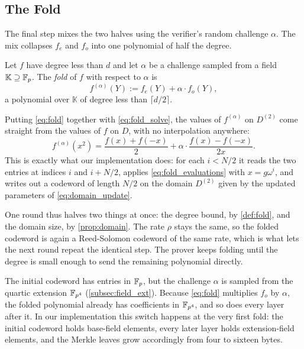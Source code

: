 \subsection{The Fold}
\label{subsec:the_fold}

The final step mixes the two halves using the verifier's random
challenge $\alpha$. The mix collapses $f_e$ and $f_o$ into one polynomial
of half the degree.

\begin{definition}
\label{def:fold}
Let $f$ have degree less than $d$ and let $\alpha$ be a challenge sampled
from a field $\mathbb{K} \supseteq \mathbb{F}_p$. The \emph{fold} of $f$ with
respect to $\alpha$ is
%
\begin{equation}
\label{eq:fold}
f^{(\alpha)}(Y) := f_{e}(Y) + \alpha \cdot f_{o}(Y) ,
\end{equation}
%
a polynomial over $\mathbb{K}$ of degree less than $\lceil d/2 \rceil$.
\end{definition}

Putting \cref{eq:fold} together with \cref{eq:fold_solve}, the values of
$f^{(\alpha)}$ on $D^{(2)}$ come straight from the values of $f$ on $D$,
with no interpolation anywhere:
%
\begin{equation}
\label{eq:fold_evaluations}
f^{(\alpha)}(x^2)
  = \frac{f(x) + f(-x)}{2}
  + \alpha \cdot \frac{f(x) - f(-x)}{2x} .
\end{equation}
%
This is exactly what our implementation does: for each $i < N/2$ it reads
the two entries at indices $i$ and $i + N/2$, applies
\cref{eq:fold_evaluations} with $x = g\omega^{i}$, and writes out a
codeword of length $N/2$ on the domain $D^{(2)}$ given by the updated
parameters of \cref{eq:domain_update}.

One round thus halves two things at once: the degree bound, by
\cref{def:fold}, and the domain size, by \cref{prop:domain}. The rate
$\rho$ stays the same, so the folded codeword is again a Reed-Solomon
codeword of the same rate, which is what lets the next round repeat the
identical step. The prover keeps folding until the degree is small enough to send the
remaining polynomial directly.

\begin{remark}
\label{rem:ext_field_fold}
The initial codeword has entries in $\mathbb{F}_p$, but the challenge $\alpha$ is
sampled from the quartic extension $\mathbb{F}_{p^4}$ (\cref{subsec:field_ext}).
Because \cref{eq:fold} multiplies $f_o$ by $\alpha$, the folded
polynomial already has coefficients in $\mathbb{F}_{p^4}$, and so does every layer
after it. In our implementation this switch happens at the very first
fold: the initial codeword holds base-field elements, every later layer
holds extension-field elements, and the Merkle leaves grow accordingly
from four to sixteen bytes.
\end{remark}

